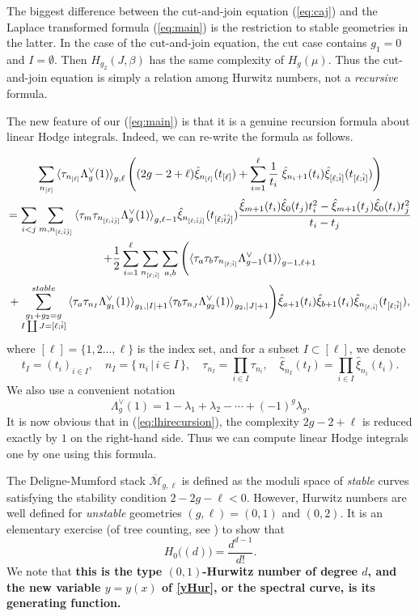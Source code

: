 \documentclass{amsart}
\theoremstyle{definition}
\numberwithin{equation}{section}
\numberwithin{figure}{section}
\def\Lam{\Lambda}
\newcommand{\be}{\begin{equation}}
\newcommand{\ee}{\end{equation}}
\newcommand{\la}{{\langle}}
\newcommand{\ra}{{\rangle}}
\newcommand{\half}{{\frac{1}{2}}}
\newcommand{\hxi}{{\hat{\xi}}}
\begin{document}
The biggest difference between the cut-and-join
equation (\ref{eq:caj}) and 
the Laplace transformed formula 
(\ref{eq:main})
is the restriction to stable geometries in
the latter. In the case of the cut-and-join equation,
the cut case contains $g_1=0$ and $I=\emptyset$.
Then $H_{g_2}(J,\beta)$ has the same complexity
of $H_g(\mu)$. Thus the cut-and-join equation
is simply a relation among Hurwitz numbers, 
not a \emph{recursive} formula.

The new feature of our (\ref{eq:main})
is that it is a genuine recursion formula
about linear Hodge integrals. Indeed, we can 
re-write the formula as follows.

\begin{multline}
\label{eq:lhirecursion}
\sum_{n_{[\ell]}}\la \tau_{n_{[\ell]}}\Lam_g ^\vee(1)\ra_{g,\ell}
\left(
 (2g-2+\ell)\hxi_{n_{[\ell]}}(t_{[\ell]})
+
\sum_{i=1} ^\ell
\frac{1}{t_i}\;
 \hxi_{n_i+1}(t_i)\hxi_{[\ell;\hat{i}]}(
t_{[\ell;\hat{i}]})
\right)
\\
=
\sum_{i<j}
\sum_{m,n_{[\ell;\hat{i}\hat{j}]}}
\la \tau_m\tau_{n_{[\ell;\hat{i}\hat{j}]}}
\Lam_{g} ^\vee (1)\ra_{g,\ell-1}
\hxi_{n_{[\ell;\hat{i}\hat{j}]}}(t_{[\ell;\hat{i}\hat{j}]})
\frac{\hxi_{m+1}(t_i) \hxi_0(t_j) t_i ^2 
-
\hxi_{m+1}(t_j) \hxi_0(t_i) t_j ^2}{t_i-t_j}
\\
+
\half\sum_{i=1}^\ell
\sum_{n_{[\ell;\hat{i}]}}\sum_{a,b}
\Bigg(
\la \tau_a\tau_b\tau_{n_{[\ell;\hat{i}]}}\Lam_{g-1} ^\vee
(1)\ra_{g-1,\ell+1}\\
+
\sum_{\substack{g_1+g_2 = g\\
I\coprod J = [\ell;\hat{i}]}} ^{\rm{stable}}
\la \tau_a\tau_{n_{I}}\Lam_{g_1} ^\vee
(1)\ra_{g_1,|I|+1}
\la \tau_b\tau_{n_{J}}\Lam_{g_2} ^\vee
(1)\ra_{g_2,|J|+1}
\Bigg)
\hxi_{a+1}(t_i)\hxi_{b+1}(t_i)\hxi_{n_{[\ell;\hat{i}]}}(
t_{[\ell;\hat{i}]}),
\end{multline}
where $[\ell]=\{1,2\dots,\ell\}$ is the index set, 
and for a subset 
$I\subset [\ell]$, we denote
$$
t_I = (t_i)_{i\in I},\quad
	 n_I = \{\, n_i\,|\, i\in I\,\},\quad 
	\tau_{n_I} = \prod_{i\in I}\tau_{n_i},
	\quad
		\hxi_{n_I}(t_I) = \prod_{i\in I}
		\hxi_{n_i}(t_i).
$$
We also use a convenient notation
$$
\Lambda_{g} ^\vee (1) = 1-\lambda_1+\lambda_2-\cdots+
(-1)^g\lambda_g.
$$
It is now obvious that in (\ref{eq:lhirecursion}),
the complexity $2g-2+\ell$ is reduced 
exactly by $1$ on the right-hand side. Thus we
can compute linear Hodge integrals one by one
using this formula.



The Deligne-Mumford stack $\overline{\mathcal{M}}_{g,\ell}$
is defined as the moduli space of \emph{stable} curves satisfying the
stability condition
$2-2g-\ell <0$.  However, Hurwitz numbers 
are well defined for \emph{unstable} geometries
 $(g,\ell) = (0,1)$ and $(0,2)$. 
It is an elementary exercise (of tree counting, see \cite{Ltext}) to 
show that
\be
\label{01Hur}
H_0\big((d)\big) = \frac{d^{d-1}}{d!}.
\ee
We note that \textbf{this is the type $(0,1)$-Hurwitz number of degree $d$, 
and the new variable $y=y(x)$ of \eqref{yHur},
or the spectral curve, is  its
 generating
function.} 
\end{document}
